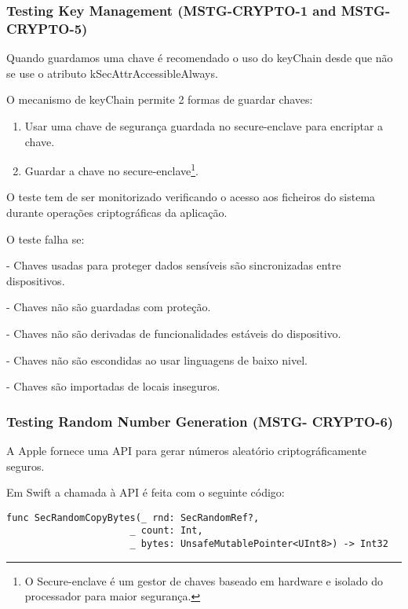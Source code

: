 \subsubsection{Testing Key Management (MSTG-CRYPTO-1 and MSTG-CRYPTO-5)}
\hfill\par
\hfill\par
Quando guardamos uma chave é recomendado o uso do keyChain desde que não se use o atributo kSecAttrAccessibleAlways.

O mecanismo de keyChain permite 2 formas de guardar chaves:
\begin{enumerate}
	\item Usar uma chave de segurança guardada no secure-enclave para encriptar a chave.

	\item Guardar a chave no secure-enclave\footnote[4]{ O Secure-enclave é um gestor de chaves baseado em hardware e isolado do processador para maior segurança\cite{book}.}.
\end{enumerate}



O teste tem de ser monitorizado verificando o acesso aos ficheiros do sistema durante operações criptográficas da aplicação.

O teste falha se:

	- Chaves usadas para proteger dados sensíveis são sincronizadas entre dispositivos.

	- Chaves não são guardadas com proteção.

	- Chaves não são derivadas de funcionalidades estáveis do dispositivo.

	- Chaves não são escondidas ao usar linguagens de baixo nivel.

	- Chaves são importadas de locais inseguros.




\subsubsection{Testing Random Number Generation (MSTG- CRYPTO-6)}
\hfill\par
\hfill\par

A Apple fornece uma API para gerar números aleatório criptográficamente seguros.

Em Swift a chamada à API é feita com o seguinte código:

\begin{lstlisting}[basicstyle=\small,]
    func SecRandomCopyBytes(_ rnd: SecRandomRef?,
                      _ count: Int,
                      _ bytes: UnsafeMutablePointer<UInt8>) -> Int32
\end{lstlisting}

